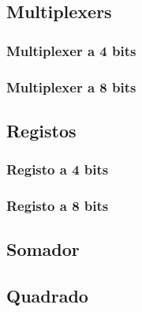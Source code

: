 \subsection{Multiplexers}

\subsubsection{Multiplexer a 4 bits}
\vspace*{\fill}

\vspace*{\fill}%

\subsubsection{Multiplexer a 8 bits}
\vspace*{\fill}

\vspace*{\fill}%

\subsection{Registos}

\subsubsection{Registo a 4 bits}
\vspace*{\fill}

\vspace*{\fill}%

\subsubsection{Registo a 8 bits}
\vspace*{\fill}

\vspace*{\fill}%

\subsection{Somador}
\vspace*{\fill}

\vspace*{\fill}%

\subsection{Quadrado}
\vspace*{\fill}

\vspace*{\fill}%

